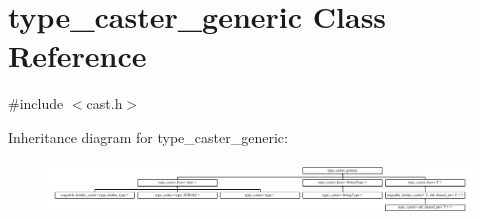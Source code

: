 \hypertarget{classtype__caster__generic}{}\section{type\+\_\+caster\+\_\+generic Class Reference}
\label{classtype__caster__generic}


{\ttfamily \#include $<$cast.\+h$>$}

Inheritance diagram for type\+\_\+caster\+\_\+generic\+:\begin{figure}[H]
\begin{center}
\leavevmode
\includegraphics[height=1.440514cm]{classtype__caster__generic}
\end{center}
\end{figure}
